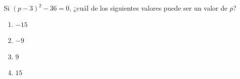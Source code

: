 \begin{problem}
    Si $(p - 3)^2 - 36 = 0$, ¿cuál de los siguientes valores puede ser un valor de $p$?

    \begin{enumerate}[label=\Alph*.]
        \item $-15$
        \item $-9$
        \item $9$
        \item $15$
    \end{enumerate}
\end{problem}
